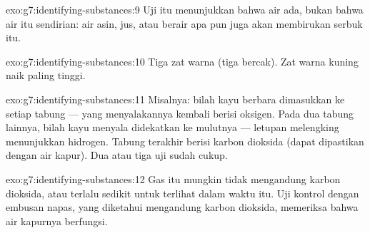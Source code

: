 \begin{solution}{exo:g7:identifying-substances:9}
Uji itu menunjukkan bahwa air ada, bukan bahwa air itu sendirian: air
asin, jus, atau  berair apa pun juga akan membirukan serbuk itu.
\end{solution}

\begin{solution}{exo:g7:identifying-substances:10}
Tiga zat warna (tiga bercak). Zat warna kuning naik paling tinggi.
\end{solution}

\begin{solution}{exo:g7:identifying-substances:11}
Misalnya: bilah kayu berbara dimasukkan ke setiap tabung --- yang
menyalakannya kembali berisi oksigen. Pada dua tabung lainnya, bilah
kayu menyala didekatkan ke mulutnya --- letupan melengking menunjukkan
hidrogen. Tabung terakhir berisi karbon dioksida (dapat dipastikan
dengan air kapur). Dua atau tiga uji sudah cukup.
\end{solution}

\begin{solution}{exo:g7:identifying-substances:12}
Gas itu mungkin tidak mengandung karbon dioksida, atau terlalu sedikit
untuk terlihat dalam waktu itu. Uji kontrol dengan  embusan napas,
yang diketahui mengandung karbon dioksida, memeriksa bahwa air kapurnya
berfungsi.
\end{solution}

